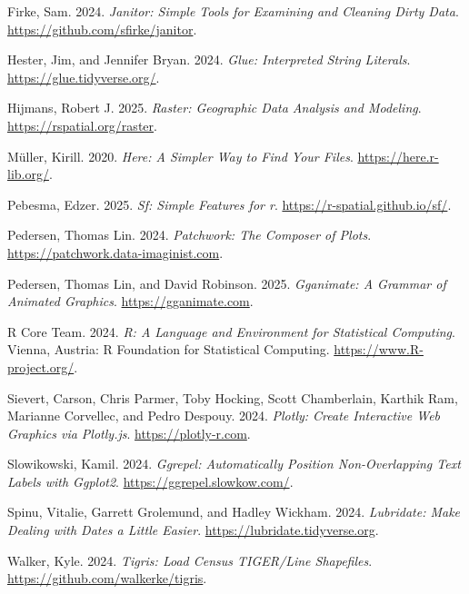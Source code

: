 \documentclass[
]{article}
\newlength{\cslhangindent}
\newenvironment{CSLReferences}[2] %
 {\begin{list}{}{%
  \setlength{\itemindent}{0pt}
  \setlength{\leftmargin}{0pt}
  \setlength{\parsep}{0pt}
  \ifodd #1
   \setlength{\leftmargin}{\cslhangindent}
   \setlength{\itemindent}{-1\cslhangindent}
  \fi
  \setlength{\itemsep}{#2\baselineskip}}}
 {\end{list}}
\begin{document}
\label{refs}
\begin{CSLReferences}{1}{0}
Firke, Sam. 2024. \emph{Janitor: Simple Tools for Examining and Cleaning
Dirty Data}. \url{https://github.com/sfirke/janitor}.

Hester, Jim, and Jennifer Bryan. 2024. \emph{Glue: Interpreted String
Literals}. \url{https://glue.tidyverse.org/}.

Hijmans, Robert J. 2025. \emph{Raster: Geographic Data Analysis and
Modeling}. \url{https://rspatial.org/raster}.

Müller, Kirill. 2020. \emph{Here: A Simpler Way to Find Your Files}.
\url{https://here.r-lib.org/}.

Pebesma, Edzer. 2025. \emph{Sf: Simple Features for r}.
\url{https://r-spatial.github.io/sf/}.

Pedersen, Thomas Lin. 2024. \emph{Patchwork: The Composer of Plots}.
\url{https://patchwork.data-imaginist.com}.

Pedersen, Thomas Lin, and David Robinson. 2025. \emph{Gganimate: A
Grammar of Animated Graphics}. \url{https://gganimate.com}.

R Core Team. 2024. \emph{R: A Language and Environment for Statistical
Computing}. Vienna, Austria: R Foundation for Statistical Computing.
\url{https://www.R-project.org/}.

Sievert, Carson, Chris Parmer, Toby Hocking, Scott Chamberlain, Karthik
Ram, Marianne Corvellec, and Pedro Despouy. 2024. \emph{Plotly: Create
Interactive Web Graphics via Plotly.js}. \url{https://plotly-r.com}.

Slowikowski, Kamil. 2024. \emph{Ggrepel: Automatically Position
Non-Overlapping Text Labels with Ggplot2}.
\url{https://ggrepel.slowkow.com/}.

Spinu, Vitalie, Garrett Grolemund, and Hadley Wickham. 2024.
\emph{Lubridate: Make Dealing with Dates a Little Easier}.
\url{https://lubridate.tidyverse.org}.

Walker, Kyle. 2024. \emph{Tigris: Load Census TIGER/Line Shapefiles}.
\url{https://github.com/walkerke/tigris}.


\end{CSLReferences}
\end{document}
